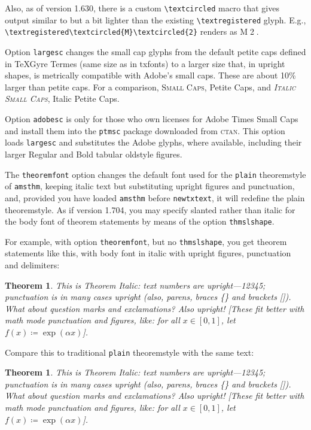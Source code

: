 \documentclass[\fsc]{article}
\theoremstyle{oldplain}
\newtheorem{oldthm}{Theorem}[section]
\theoremstyle{plain}
\newtheorem{thm}{Theorem}[section]
\begin{document}
Also, as of version 1.630, there is a custom \verb|\textcircled| macro that gives output similar to but a bit lighter than the existing \verb|\textregistered| glyph. E.g., \verb|\textregistered\textcircled{M}\textcircled{2}| renders as \textregistered\textcircled{M}\textcircled{2}.

Option \texttt{largesc} changes the small cap glyphs from the default petite caps defined in TeXGyre Termes (same size as in txfonts) to a larger size that, in upright shapes, is metrically compatible with Adobe's small caps. These are about 10\% larger than petite caps. For a comparison, \textsc{Small Caps}, {Petite Caps}, and \textsc{\textit{Italic Small Caps}}, {Italic Petite Caps}.

Option \texttt{adobesc} is only for those who own licenses for \textsf{Adobe Times Small Caps} and install them into the \texttt{ptmsc} package downloaded from \textsc{ctan}. This option loads \texttt{largesc} and substitutes the Adobe glyphs, where available, including their larger Regular and Bold tabular oldstyle figures.

The {\tt theoremfont} option changes the default font used for the {\tt plain} theoremstyle of {\tt amsthm}, keeping italic text but substituting upright figures and punctuation, and, provided you have loaded {\tt amsthm} before {\tt newtxtext}, it will redefine the plain theoremstyle.  As if version 1.704, you may specify slanted rather than italic for the body font of theorem statements by means of the option {\tt thmslshape}. 

For example, with option {\tt theoremfont}, but no {\tt thmslshape}, you get theorem statements like this, with body font in italic with upright figures, punctuation and delimiters:


\begin{thm}
This is Theorem Italic:
text numbers are upright---12345; punctuation is in many cases upright (also, parens, braces \{\} and brackets []). What about question marks and exclamations? Also upright! [These fit better with math mode punctuation and figures, like: for all $x\in[0,1]$, let $f(x)\coloneq \exp(\alpha x)$].
\end{thm}
Compare this to traditional {\tt plain} theoremstyle with the same text:
\begin{oldthm}
This is Theorem Italic: text numbers are upright---12345; punctuation is in many cases upright (also, parens, braces \{\} and brackets []). What about question marks and exclamations? Also upright! [These fit better with math mode punctuation and figures, like: for all $x\in[0,1]$, let $f(x)\coloneq \exp(\alpha x)$].
\end{oldthm}
\end{document}
